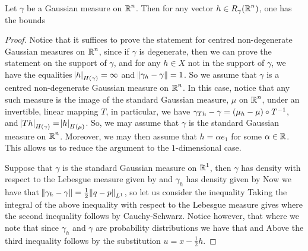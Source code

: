 \documentclass[../main.tex]{subfiles}
\begin{document}
\begin{lemma}
\label{lem:tvd_bound}
Let $\gamma$ be a Gaussian measure on $\operatorname{\mathbb{R}}^n$. Then for any vector $h\in R_\gamma(\operatorname{\mathbb{R}}^n)$, one has the bounds 
\end{lemma}
\begin{proof}
Notice that it suffices to prove the statement for centred non-degenerate Gaussian measures on $\operatorname{\mathbb{R}}^n$, since if $\gamma$ is degenerate, then we can prove the statement on the support of $\gamma$, and for any $h\in X$ not in the support of $\gamma$, we have the equalities $\abs{h}_{H(\gamma)} = \infty$ and $\norm{\gamma_h - \gamma} = 1$. So we assume that $\gamma$ is a centred non-degenerate Gaussian measure on $\operatorname{\mathbb{R}}^n$. In this case, notice that any such measure is the image of the standard Gaussian measure, $\mu$ on $\operatorname{\mathbb{R}}^n$, under an invertible, linear mapping $T$, in particular, we have $\gamma_{Th} - \gamma = \del{\mu_h - \mu}\circ T^{-1}$, and $\abs{Th}_{H(\gamma)} = \abs{h}_{H(\mu)}$. So, we may assume that $\gamma$ is the standard Gaussian measure on $\operatorname{\mathbb{R}}^n$. Moreover, we may then assume that $h = \alpha e_1$ for some $\alpha\in\operatorname{\mathbb{R}}$. This allows us to reduce the argument to the $1$-dimensional case.

Suppose that $\gamma$ is the standard Gaussian measure on $\operatorname{\mathbb{R}}^1$, then $\gamma$ has density with respect to the Lebesgue measure given by  and $\gamma_h$ has density given by  Now we have that $\norm{\gamma_h - \gamma} = \frac12\norm{q - p}_{L^1}$, so let us consider the inequality  Taking the integral of the above inequality with respect to the Lebesgue measure gives  where the second inequality follows by Cauchy-Schwarz. Notice however, that  where we note that since $\gamma_h$ and $\gamma$ are probability distributions we have that  and  Above the third inequality follows by the substitution $u = x-\frac12h$.


\end{proof}
\end{document}
